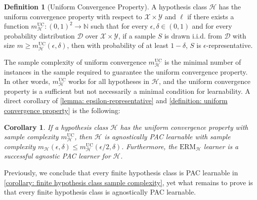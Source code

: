 \documentclass[openany, amssymb, psamsfonts]{amsart}
\newtheorem{cor}{Corollary}[section]
\theoremstyle{definition}
\newtheorem{defn}{Definition}[section]
\numberwithin{equation}{section}
\begin{document}
\begin{defn}[Uniform Convergence Property] \label{definition: uniform convergence property}
A hypothesis class $\mathcal{H}$ has the uniform convergence property with respect to $\mathcal{X} \times \mathcal{Y}$ and $\ell$ if there exists a function $m_{\mathcal{H}}^{\text{UC}}: (0,1)^2 \to \mathbb{N}$ such that for every $\epsilon, \delta \in (0,1)$ and for every probability distribution $\mathcal{D}$ over $\mathcal{X} \times \mathcal{Y}$, if a sample $S$ is drawn i.i.d. from $\mathcal{D}$ with size $m \geq m_{\mathcal{H}}^{\text{UC}}(\epsilon, \delta)$, then with probability of at least $1 - \delta$, $S$ is $\epsilon$-representative.
\end{defn}

The sample complexity of uniform convergence $m_{\mathcal{H}}^{\text{UC}}$ is the minimal number of instances in the sample required to guarantee the uniform convergence property. In other words, $m_{\mathcal{H}}^{\text{UC}}$ works for all hypotheses in $\mathcal{H}$, and the uniform convergence property is a sufficient but not necessarily a minimal condition for learnability. A direct corollary of \autoref{lemma: epsilon-representative} and \autoref{definition: uniform convergence property} is the following:

\begin{cor} \label{corollary: uniform convergence implies agnostic PAC learnability}
If a hypothesis class $\mathcal{H}$ has the uniform convergence property with sample complexity $m_{\mathcal{H}}^{\text{UC}}$, then $\mathcal{H}$ is agnostically PAC learnable with sample complexity $m_{\mathcal{H}}(\epsilon, \delta) \leq m_{\mathcal{H}}^{\text{UC}}(\epsilon/2, \delta)$. Furthermore, the $\mathrm{ERM}_\mathcal{H}$ learner is a successful agnostic PAC learner for $\mathcal{H}$.
\end{cor}

Previously, we conclude that every finite hypothesis class is PAC learnable in \autoref{corollary: finite hypothesis class sample complexity}, yet what remains to prove is that every finite hypothesis class is agnostically PAC learnable.
\end{document}
